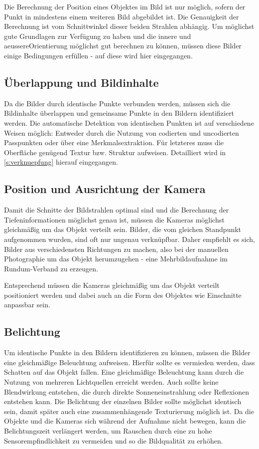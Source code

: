 \documentclass[./00PhotoBox.tex]{subfiles}
\begin{document}
Die Berechnung der Position eines Objektes im Bild ist nur möglich, sofern der Punkt in mindestens einem weiteren Bild abgebildet ist. Die Genauigkeit der Berechnung ist vom Schnittwinkel dieser beiden Strahlen abhängig. Um möglichst gute Grundlagen zur Ver\-fügung zu haben und die innere und \gls{aeussereOrientierung} möglichst gut berechnen zu können, müssen diese Bilder einige Bedingungen erfüllen - auf diese wird hier eingegangen.

\subsection{Überlappung und Bildinhalte}
Da die Bilder durch identische Punkte verbunden werden, müssen sich die Bildinhalte überlappen und gemeinsame Punkte in den Bildern identifiziert werden. Die automatische Detektion von identischen Punkten ist auf verschiedene Weisen möglich: Entweder durch die Nutzung von codierten und uncodierten Passpunkten oder über eine Merkmalsextraktion. Für letzteres muss die Oberfläche genügend Textur bzw. Struktur aufweisen. Detailliert wird in \autoref{s:verknuepfung} hierauf eingegangen. \citep[S. 478]{luhmann}

\subsection{Position und Ausrichtung der Kamera}
Damit die Schnitte der Bildstrahlen optimal sind und die Berechnung der Tiefeninformationen möglichst genau ist, müssen die Kameras möglichst gleichmäßig um das Objekt verteilt sein.
Bilder, die vom gleichen Standpunkt aufgenommen wurden, sind oft nur ungenau verknüpfbar. Daher empfiehlt es sich, Bilder aus verschiedensten Richtungen zu machen, also bei der manuellen Photographie um das Objekt herumzugehen - eine Mehrbildaufnahme im Rundum-Verband zu erzeugen. \citep[S. 170]{luhmann}

Entsprechend müssen die Kameras gleichmäßig um das Objekt verteilt positioniert werden und dabei auch an die Form des Objektes wie Einschnitte anpassbar sein.

\subsection{Belichtung}
Um identische Punkte in den Bildern identifizieren zu können, müssen die Bilder eine gleichmäßige Beleuchtung aufweisen. Hierfür sollte es vermieden werden, dass Schatten auf das Objekt fallen. Eine gleichmäßige Beleuchtung kann durch die Nutzung von mehreren Lichtquellen erreicht werden. Auch sollte keine Blendwirkung entstehen, die durch direkte Sonneneinstrahlung oder Reflexionen entstehen kann. Die Belichtung der einzelnen Bilder sollte möglichst identisch sein, damit später auch eine zusammenhängende Texturierung möglich ist.
Da die Objekte und die Kameras sich während der Aufnahme nicht bewegen, kann die Belichtungszeit verlängert werden, um Rauschen durch eine zu hohe Sensorempfindlichkeit zu vermeiden und so die Bildqualität zu erhöhen.
\end{document}
